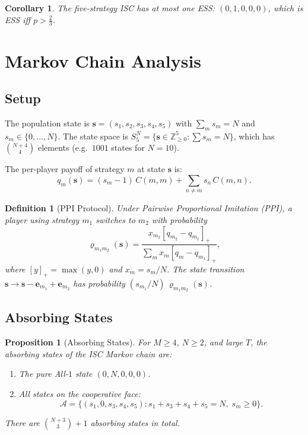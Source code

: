\documentclass[12pt,a4paper]{article}
\newtheorem{definition}{Definition}[section]
\newtheorem{proposition}{Proposition}[section]
\newtheorem{corollary}{Corollary}[section]
\begin{document}
\begin{corollary}
The five-strategy ISC has at most one ESS: $(0,1,0,0,0)$, which is ESS iff
$p>\tfrac{2}{3}$.
\end{corollary}

\section{Markov Chain Analysis}
\label{sec:markov}

\subsection{Setup}

The population state is $\mathbf{s}=(s_1,s_2,s_3,s_4,s_5)$ with
$\sum_m s_m=N$ and $s_m\in\{0,\ldots,N\}$.  The state space is
$S_5^N=\{\mathbf{s}\in\mathbb{Z}_{\geq 0}^5: \sum s_m=N\}$, which has
$\binom{N+4}{4}$ elements (e.g.\ $1001$ states for $N=10$).

The per-player payoff of strategy $m$ at state $\mathbf{s}$ is:
\begin{equation}\label{eq:qm}
  q_m(\mathbf{s}) = (s_m-1)\,C(m,m) + \sum_{n\neq m} s_n\,C(m,n).
\end{equation}

\begin{definition}[PPI Protocol]\label{def:PPI}
Under \emph{Pairwise Proportional Imitation} (PPI), a player using strategy
$m_1$ switches to $m_2$ with probability
\[
  \varrho_{m_1 m_2}(\mathbf{s}) =
  \frac{x_{m_2}[q_{m_2}-q_{m_1}]_+}{\sum_m x_m[q_m-q_{m_1}]_+},
\]
where $[y]_+=\max(y,0)$ and $x_m=s_m/N$.
The state transition $\mathbf{s}\to\mathbf{s}-\mathbf{e}_{m_1}+\mathbf{e}_{m_2}$
has probability $(s_{m_1}/N)\,\varrho_{m_1 m_2}(\mathbf{s})$.
\end{definition}

\subsection{Absorbing States}

\begin{proposition}[Absorbing States]\label{prop:absorbing}
For $M\geq 4$, $N\geq 2$, and large $T$, the absorbing states of the
ISC Markov chain are:
\begin{enumerate}
  \item The pure All-$1$ state $(0,N,0,0,0)$.
  \item All states on the cooperative face:
        \begin{equation}\label{eq:absface}
          \mathcal{A} = \{(s_1,0,s_3,s_4,s_5) : s_1+s_3+s_4+s_5=N,\; s_m\geq 0\}.
        \end{equation}
\end{enumerate}
There are $\binom{N+3}{3}+1$ absorbing states in total.
\end{proposition}
\end{document}
